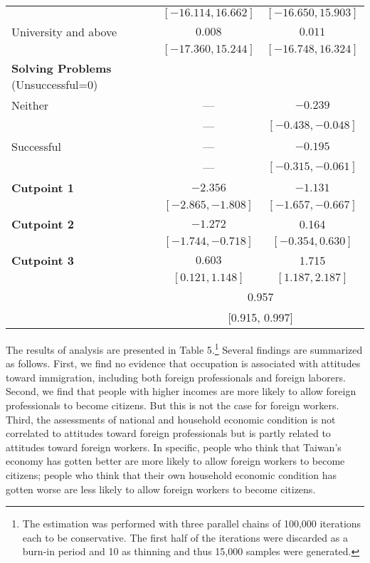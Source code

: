 \documentclass[12pt]{article}
\begin{document}
\begin{center}
{\begin{longtable}{l|cc}
           & $[-16.114, 16.662]$   & $[-16.650, 15.903]$    \\  
University and above  & $0.008$        & $0.011$         \\
          & $[-17.360, 15.244]$   & $[-16.748, 16.324]$    \\  
\textbf{Solving Problems} (Unsuccessful=0)   &               &            \\
Neither         & ---                & $-0.239$               \\
            & ---   & $[-0.438, -0.048]$     \\
Successful   & ---                & $-0.195$                  \\
           & ---   & $[-0.315, -0.061]$    \\
\hline
\textbf{Cutpoint 1}  & $-2.356$                & $-1.131$          \\
          & $[-2.865, -1.808]$   & $[-1.657, -0.667]$       \\
\textbf{Cutpoint 2}  & $-1.272$                & 0.164          \\
          & $[-1.744, -0.718]$   & $[-0.354, 0.630]$       \\
\textbf{Cutpoint 3}  & $0.603$                & 1.715          \\
          & $[0.121, 1.148]$   & $[1.187, 2.187]$       \\
\hline
\bm{$\rho$}           & \multicolumn{2}{c}{0.957}              \\
                      & \multicolumn{2}{c}{[0.915, 0.997]} 
\label{table6}
\end{longtable}
}
\endgroup
\end{center}



The results of analysis are presented in Table 5.\footnote{The estimation was performed with three parallel chains of 100,000 iterations each to be conservative. The first half of the iterations were discarded as a burn-in period and 10 as thinning and thus 15,000 samples were generated.} Several findings are summarized as follows. First, we find no evidence that occupation is associated with attitudes toward immigration, including both foreign professionals and foreign laborers. Second, we find that people with higher incomes are more likely to allow foreign professionals to become citizens. But this is not the case for foreign workers. Third, the assessments of national and household economic condition is not correlated to attitudes toward foreign professionals but is partly related to attitudes toward foreign workers. In specific, people who think that Taiwan's economy has gotten better are more likely to allow foreign workers to become citizens; people who think that their own household economic condition has gotten worse are less likely to allow foreign workers to become citizens. 
\end{document}
